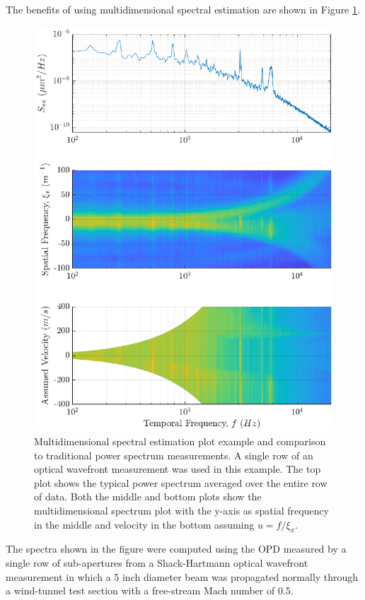 The benefits of using multidimensional spectral estimation are shown in Figure \ref{fig:04_dispersion_demo}.
\begin{figure}
\centering
  \includegraphics{../matlab/04_dispersion_analysis/dispersion_demo.eps}
  \caption{Multidimensional spectral estimation plot example and comparison to traditional power spectrum measurements. A single row of an optical wavefront measurement was used in this example. The top plot shows the typical power spectrum averaged over the entire row of data. Both the middle and bottom plots show the multidimensional spectrum plot with the y-axis as spatial frequency in the middle and velocity in the bottom assuming $u=f/\xi_x$.}
  \label{fig:04_dispersion_demo}
\end{figure}
The spectra shown in the figure were computed using the OPD measured by a single row of sub-apertures from a Shack-Hartmann optical wavefront measurement in which a 5 inch diameter beam was propagated normally through a wind-tunnel test section with a free-stream Mach number of 0.5.
